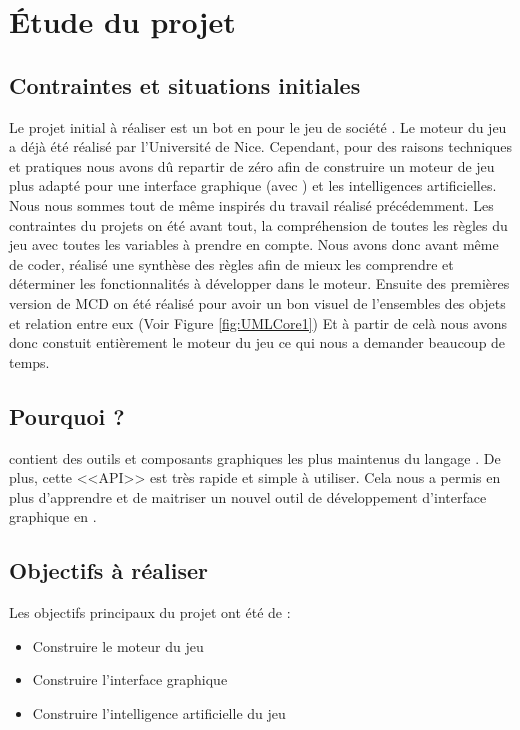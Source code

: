 \section{Étude du projet}
\subsection{Contraintes et situations initiales}
Le projet initial à réaliser est un bot en \java pour le jeu de société \himalaya. Le moteur du jeu a déjà été réalisé par l'Université de Nice. Cependant, pour des raisons techniques et pratiques nous avons dû repartir de zéro afin de construire un moteur de jeu plus adapté pour une interface graphique (avec \fx) et les intelligences artificielles. Nous nous sommes tout de même inspirés du travail réalisé précédemment. 
Les contraintes du projets on été avant tout, la compréhension de toutes les règles du jeu avec toutes les variables à prendre en compte. Nous avons donc avant même de coder, réalisé une synthèse des règles afin de mieux les comprendre et déterminer les fonctionnalités à développer dans le moteur. Ensuite des premières version de MCD on été réalisé pour avoir un bon visuel de l'ensembles des objets et relation entre eux (Voir Figure \ref{fig:UMLCore1}) Et à partir de celà nous avons donc constuit entièrement le moteur du jeu ce qui nous a demander beaucoup de temps.

\subsection{Pourquoi \fx ?}
\fx contient des outils et composants graphiques les plus maintenus du langage \java.
De plus, cette <<API>> est très rapide et simple à utiliser.
Cela nous a permis en plus d’apprendre et de maitriser un nouvel outil de développement d’interface graphique en \java.

\subsection{Objectifs à réaliser}
Les objectifs principaux du projet ont été de :
\begin{itemize} 
	\item Construire le moteur du jeu
	\item Construire l'interface graphique
	\item Construire l’intelligence artificielle du jeu
\end{itemize}
